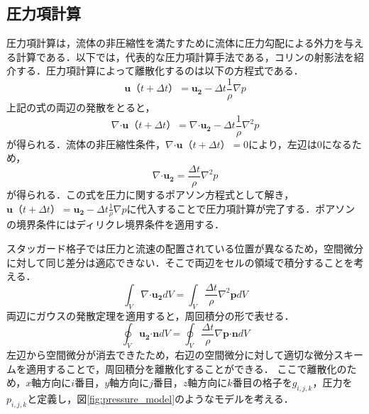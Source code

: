 \documentclass[a4j,12pt]{jreport}
\begin{document}
\subsection{圧力項計算}
圧力項計算は，流体の非圧縮性を満たすために流体に圧力勾配による外力を与える計算である．以下では，代表的な圧力項計算手法である，コリンの射影法を紹介する．圧力項計算によって離散化するのは以下の方程式である．
\[
	\bm{u} （t + \varDelta t）=  \bm{u_2} - \varDelta t \frac{1}{\rho}\nabla p
\]
上記の式の両辺の発散をとると，
\[
	\nabla\boldsymbol{\cdot}\bm{u} （t + \varDelta t）=  \nabla\boldsymbol{\cdot}\bm{u_2} - \varDelta t \frac{1}{\rho}\nabla^2 p
\]
が得られる．流体の非圧縮性条件，$\nabla\boldsymbol{\cdot}\bm{u} （t + \varDelta t）= 0$により，左辺は0になるため，
\begin{equation}
\nabla\boldsymbol{\cdot}\bm{u_2} = \frac{\varDelta t}{\rho}\nabla^2 p
\end{equation} 
が得られる．この式を圧力に関するポアソン方程式として解き，$\bm{u} （t + \varDelta t）=  \bm{u_2} - \varDelta t \frac{1}{\rho}\nabla p$に代入することで圧力項計算が完了する．ポアソンの境界条件にはディリクレ境界条件を適用する．

スタッガード格子では圧力と流速の配置されている位置が異なるため，空間微分に対して同じ差分は適応できない．そこで両辺をセルの領域で積分することを考える．
\[
\int_V\nabla\boldsymbol{\cdot}\bm{u_2} dV= \int_V\frac{\varDelta t}{\rho}\nabla^2 \bm{p}  dV
\]
両辺にガウスの発散定理を適用すると，周回積分の形で表せる．
\[
\oint_V\bm{u_2}\boldsymbol{\cdot}\bm{n} dV= \oint_V\frac{\varDelta t}{\rho}\nabla \bm{p}  \boldsymbol{\cdot}\bm{n}dV
\]
左辺から空間微分が消去できたため，右辺の空間微分に対して適切な微分スキームを適用することで，周回積分を離散化することができる．
ここで離散化のため，$x軸方向にi番目，y軸方向にj番目，z軸方向にk番目の格子を$$g_{i,j,k}$，圧力を$p_{i,j,k}$と定義し，図\ref{fig:pressure_model}のようなモデルを考える．
\end{document}
